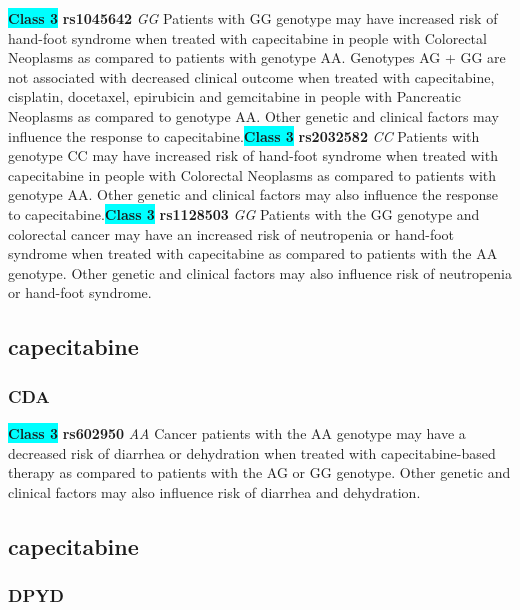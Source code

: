 \documentclass{book}
\begin{document}
\begin{center}
\textbf{\colorbox{cyan} {Class 3}} \textbf{ rs1045642 } \textit{ GG }
Patients with GG genotype may have increased risk of hand-foot syndrome when treated with capecitabine in people with Colorectal Neoplasms as compared to patients with genotype AA. Genotypes AG + GG are not associated with decreased clinical outcome when treated with capecitabine, cisplatin, docetaxel, epirubicin and gemcitabine in people with Pancreatic Neoplasms as compared to genotype AA. Other genetic and clinical factors may influence the response to capecitabine.\textbf{\colorbox{cyan} {Class 3}} \textbf{ rs2032582 } \textit{ CC }
Patients with genotype CC may have increased risk of hand-foot syndrome when treated with capecitabine in people with Colorectal Neoplasms as compared to patients with genotype AA. Other genetic and clinical factors may also influence the response to capecitabine.\textbf{\colorbox{cyan} {Class 3}} \textbf{ rs1128503 } \textit{ GG }
Patients with the GG genotype and colorectal cancer may have an increased risk of neutropenia or hand-foot syndrome when treated with capecitabine as compared to patients with the AA genotype. Other genetic and clinical factors may also influence risk of neutropenia or hand-foot syndrome.


\end{center}\subsection{ capecitabine }


\subsubsection{ CDA }

\begin{center}
\textbf{\colorbox{cyan} {Class 3}} \textbf{ rs602950 } \textit{ AA }
Cancer patients with the AA genotype may have a decreased risk of diarrhea or dehydration when treated with capecitabine-based therapy as compared to patients with the AG or GG genotype. Other genetic and clinical factors may also influence risk of diarrhea and dehydration.


\end{center}\subsection{ capecitabine }


\subsubsection{ DPYD }
\end{document}
